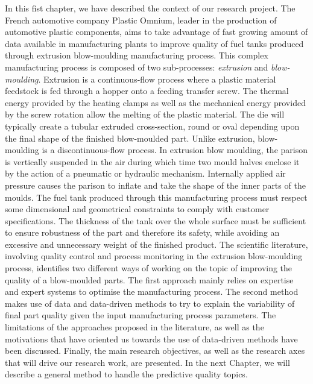 In this fist chapter, we have described the context of our research project. The French automotive company Plastic Omnium, leader in the production of automotive plastic components, aims to take advantage of fast growing amount of data available in manufacturing plants to improve quality of fuel tanks produced through extrusion blow-moulding manufacturing process. This complex manufacturing process is composed of two sub-processes: \textit{extrusion} and \textit{blow-moulding}. Extrusion is a continuous-flow process where a plastic material feedstock is fed through a hopper onto a feeding transfer screw. The thermal energy provided by the heating clamps as well as the mechanical energy provided by the screw rotation allow the melting of the plastic material. The die will typically create a tubular extruded cross-section, round or oval depending upon the final shape of the finished blow-moulded part. Unlike extrusion, blow-moulding is a discontinuous-flow process. In extrusion blow moulding, the parison is vertically suspended in the air during which time two mould halves enclose it by the action of a pneumatic or hydraulic mechanism. Internally applied air pressure causes the parison to inflate and take the shape of the inner parts of the moulds. The fuel tank produced through this manufacturing process must respect some dimensional and geometrical constraints to comply with customer specifications. The thickness of the tank over the whole surface must be sufficient to ensure robustness of the part and therefore its safety, while avoiding an excessive and unnecessary weight of the finished product. The scientific literature, involving quality control and process monitoring in the extrusion blow-moulding process, identifies two different ways of working on the topic of improving the quality of a blow-moulded parts. The first approach mainly relies on expertise and expert systems to optimise the manufacturing process. The second method makes use of data and data-driven methods to try to explain the variability of final part quality given the input manufacturing process parameters. The limitations of the approaches proposed in the literature, as well as the motivations that have oriented us towards the use of data-driven methods have been discussed. Finally, the main research objectives, as well as the research axes that will drive our research work, are presented. In the next Chapter, we will describe a general method to handle the predictive quality topics.   

